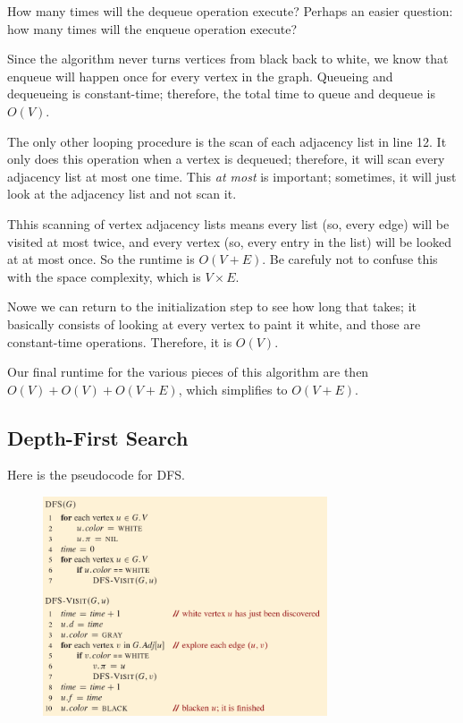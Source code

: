 \documentclass[]{article}
\begin{document}
How many times will the dequeue operation execute? Perhaps an easier question: how many times will the enqueue operation execute?

Since the algorithm never turns vertices from black back to white, we know that enqueue will happen once for every vertex in the graph. Queueing and dequeueing is constant-time; therefore, the total time to queue and dequeue is $O(V)$. 

The only other looping procedure is the scan of each adjacency list in line 12. It only does this operation when a vertex is dequeued; therefore, it will scan every adjacency list at most one time. This \textit{at most} is important; sometimes, it will just look at the adjacency list and not scan it. 

Thhis scanning of vertex adjacency lists means every list (so, every edge) will be visited at most twice, and every vertex (so, every entry in the list) will be looked at at most once. So the runtime is $O(V+E)$. Be carefuly not to confuse this with the space complexity, which is $V \times E$. 

Nowe we can return to the initialization step to see how long that takes; it basically consists of looking at every vertex to paint it white, and those are constant-time operations. Therefore, it is $O(V)$. 

Our final runtime for the various pieces of this algorithm are then $O(V) + O(V) + O(V+E)$, which simplifies to $O(V+E)$. 

\subsection*{Depth-First Search}

Here is the pseudocode for DFS.

\begin{figure}[h]
    \includegraphics[width=0.75\textwidth]{dfs-pseudocode.png}
\end{figure}
\end{document}
